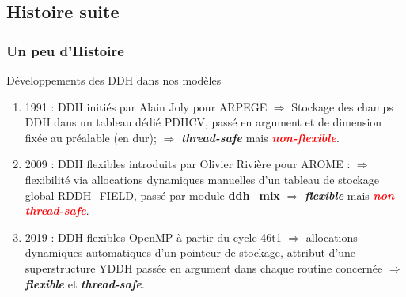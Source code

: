 \documentclass[aspectratio=169]{beamer}
\newcommand{\red}[1]{\textcolor{red}{#1}}
\newcommand{\green}[1]{\textcolor{mydarkgreen}{#1}}
\begin{document}
\subsection{Histoire suite}
\begin{frame}
\frametitle{\normalsize Un peu d'Histoire }
\vspace{-.3cm}
\begin{block}{\normalsize{Développements des DDH dans nos modèles}}
\begin{enumerate}
 \item 1991 : DDH initiés par Alain Joly pour ARPEGE $\Rightarrow$ 
 Stockage des champs DDH dans un tableau dédié PDHCV, 
 passé en argument et de dimension fixée au préalable (en dur);  
 $\Rightarrow$ \textbf{\textit{\green{thread-safe}}} mais \textbf{\textit{\red{non-flexible}}}.\\
 \item 2009 : DDH flexibles introduits par Olivier Rivière pour AROME : 
 $\Rightarrow$ flexibilité via allocations dynamiques manuelles  
 d'un tableau de stockage global RDDH\_FIELD, passé par module \textbf{ddh\_mix} 
 $\Rightarrow$ \textbf{\textit{\green{flexible}}} mais \textbf{\textit{\red{non thread-safe}}}.\\
 \item 2019 : DDH flexibles OpenMP à partir du cycle 46t1 $\Rightarrow$ allocations dynamiques automatiques 
 d'un pointeur de stockage, attribut d'une superstructure YDDH passée en argument dans chaque routine concernée $\Rightarrow$ \textbf{\textit{\green{flexible}}} et \textbf{\textit{\green{thread-safe}}}.
\end{enumerate}
\end{block}
\logos
\end{frame}
\end{document}
